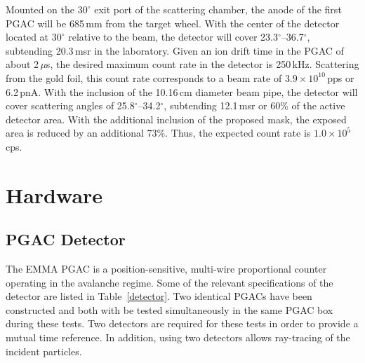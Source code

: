 Mounted on the $30^\circ$ exit port of the scattering chamber, the %
anode of the first PGAC will be 685\,mm from the target wheel.  With the center of the detector located at $30^\circ$ relative to the beam, the detector will cover 23.3$^\circ$--36.7$^\circ$, subtending 20.3\,msr in the laboratory.  Given an ion drift time in the PGAC of about 2\,$\mu$s, the desired maximum count rate in the detector is 250\,kHz.  Scattering from the gold foil, this count rate corresponds to a beam rate of $3.9 \times 10^{10}$\,pps or 6.2\,pnA. %
With the inclusion of the 10.16\,cm diameter beam pipe, %
the detector will cover scattering angles of 25.8$^\circ$--34.2$^\circ$, subtending 12.1\,msr or 60\% of the active detector area. With the additional inclusion of the proposed mask, the exposed area is reduced by an additional 73\%.   Thus, the expected count rate is $1.0 \times 10^5$\,cps.



\section{Hardware}
\subsection{PGAC Detector}
The EMMA PGAC is a position-sensitive, multi-wire proportional counter operating in the avalanche regime. Some of the relevant specifications of the detector are listed in Table~\ref{detector}.  Two identical PGACs have been constructed and both with be tested simultaneously in the same PGAC box during these tests.  Two detectors are required for these tests in order to provide a mutual time reference.  In addition, using two detectors allows ray-tracing of the incident particles.


